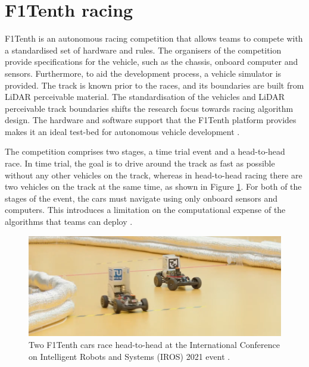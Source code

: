 

\section{F1Tenth racing}\label{sec:f1tenth}

F1Tenth is an autonomous racing competition that allows teams to compete with a standardised set of hardware and rules.
The organisers of the competition provide specifications for the vehicle, such as the chassis, onboard computer and sensors.
Furthermore, to aid the development process, a vehicle simulator is provided. 
The track is known prior to the races, and its boundaries are built from LiDAR perceivable material.
The standardisation of the vehicles and LiDAR perceivable track boundaries shifts the research focus towards racing algorithm design.
The hardware and software support that the F1Tenth platform provides makes it an ideal test-bed for autonomous vehicle development \cite{f1tenth}.

The competition comprises two stages, a time trial event and a head-to-head race.
In time trial, the goal is to drive around the track as fast as possible without any other vehicles on the track, whereas in head-to-head racing there are two vehicles on the track at the same time, as shown in Figure \ref{fig:f1tenth_prague}.
For both of the stages of the event, the cars must navigate using only onboard sensors and computers. 
This introduces a limitation on the computational expense of the algorithms that teams can deploy \cite{f1tenth}.

\begin{figure}[htb!]
    \centering
    \includegraphics[width=\textwidth*7/10]{contents/chapt2/figs/f1tenth_prague_1.png}
    \caption[Two F1Tenth cars racing head-to-head]{Two F1Tenth cars race head-to-head at the International Conference on Intelligent Robots and Systems (IROS) 2021 event \cite{f1tenth}.}
    \label{fig:f1tenth_prague}
\end{figure}


